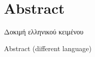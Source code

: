 %
\chapter*{Abstract}
\label{sec:abstract}
\vspace*{-10mm}

Δοκιμή ελληνικού κειμένου

\vspace*{20mm}

{Abstract (different language)}\label{sec:abstract-diff} \\

\blindtext
